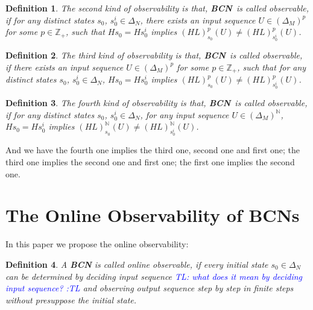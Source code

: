 \documentclass[letterpaper, 10 pt, conference]{ieeeconf}  %
\newtheorem{definition}{Definition}
\def \BCN {{\bf BCN}}
\newcommand{\tl}[1]{\textcolor{blue} {TL: #1 :TL} }
\begin{document}
\begin{definition}
	The second kind of observability is that, \BCN\ is called observable, if for any distinct states $s_0$, $s^i_0 \in \Delta_N$, there exists an input sequence $U\in(\Delta_M)^p$ for some $p\in \mathbb{Z}_+$, such that $Hs_0=Hs^i_0$ implies $(HL)^p_{s_0}(U)\neq (HL)^p_{s^i_0}(U)$.
\end{definition}
\begin{definition}
	The third kind of observability is that, \BCN\ is called observable, if there exists an input sequence $U\in(\Delta_M)^p$ for some $p\in \mathbb{Z}_+$, such that for any distinct states $s_0$, $s^i_0 \in \Delta_N$, $Hs_0=Hs^i_0$ implies $(HL)^p_{s_0}(U)\neq (HL)^p_{s^i_0}(U)$.
\end{definition}
\begin{definition}
	The fourth kind of observability is that, \BCN\ is called observable, if for any distinct states $s_0$, $s^i_0 \in \Delta_N$, for any input sequence $U\in(\Delta_M)^{\mathbb{N}}$, $Hs_0=Hs^i_0$ implies $(HL)^{\mathbb{N}}_{s_0}(U)\neq (HL)^{\mathbb{N}}_{s^i_0}(U)$.
\end{definition}

And we have the fourth one implies the third one, second one and first one; the third one implies the second one and first one; the first one implies the second one. 

\section{The Online Observability of BCNs}
In this paper we propose the online observability: 

\begin{definition}
	A {\bf BCN} is called online observable, if every initial state $s_0 \in \Delta_N$ can be determined by   deciding input sequence \tl{what does it mean by deciding input sequence?} and observing output sequence step by step in finite steps without presuppose the  initial state.
\end{definition}

\end{document}
